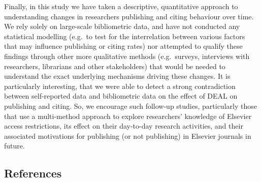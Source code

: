 \documentclass[
]{article}
\begin{document}
Finally, in this study we have taken a descriptive, quantitative approach to understanding changes in researchers publishing and citing behaviour over time. We rely solely on large-scale bibliometric data, and have not conducted any statistical modelling (e.g.~to test for the interrelation between various factors that may influence publishing or citing rates) nor attempted to qualify these findings through other more qualitative methods (e.g.~surveys, interviews with researchers, librarians and other stakeholders) that would be needed to understand the exact underlying mechanisms driving these changes. It is particularly interesting, that we were able to detect a strong contradiction between self-reported data and bibliometric data on the effect of DEAL on publishing and citing. So, we encourage such follow-up studies, particularly those that use a multi-method approach to explore researchers' knowledge of Elsevier access restrictions, its effect on their day-to-day research activities, and their associated motivations for publishing (or not publishing) in Elsevier journals in future.

\hypertarget{references}{%
\subsection{References}\label{references}}
\end{document}
